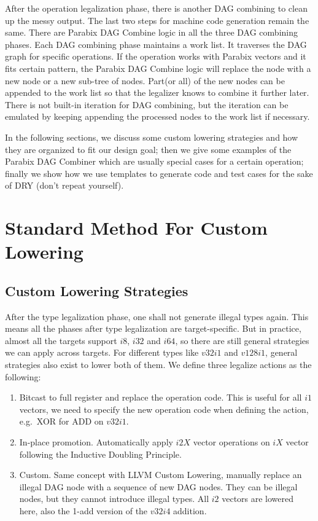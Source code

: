 After the operation legalization phase, there is another DAG combining to clean up the messy output. The last two steps for machine code generation remain the same. There are Parabix DAG Combine logic in all the three DAG combining phases. Each DAG combining phase maintains a work list. It traverses the DAG graph for specific operations. If the operation works with Parabix vectors and it fits certain pattern, the Parabix DAG Combine logic will replace the node with a new node or a new sub-tree of nodes. Part(or all) of the new nodes can be appended to the work list so that the legalizer knows to combine it further later. There is not built-in iteration for DAG combining, but the iteration can be emulated by keeping appending the processed nodes to the work list if necessary.

In the following sections, we discuss some custom lowering strategies and how they are organized to fit our design goal; then we give some examples of the Parabix DAG Combiner which are usually special cases for a certain operation; finally we show how we use templates to generate code and test cases for the sake of DRY (don't repeat yourself).

\section{Standard Method For Custom Lowering}
\subsection{Custom Lowering Strategies}
After the type legalization phase, one shall not generate illegal types again. This means all the phases after type legalization are target-specific. But in practice, almost all the targets support $i8$, $i32$ and $i64$, so there are still general strategies we can apply across targets. For different types like $v32i1$ and $v128i1$, general strategies also exist to lower both of them. We define three legalize actions as the following:
\begin{enumerate}
    \item Bitcast to full register and replace the operation code. This is useful for all $i1$ vectors, we need to specify the new operation code when defining the action, e.g.\ XOR for ADD on $v32i1$.
    \item In-place promotion. Automatically apply $i2X$ vector operations on $iX$ vector following the Inductive Doubling Principle.
    \item Custom. Same concept with LLVM Custom Lowering, manually replace an illegal DAG node with a sequence of new DAG nodes. They can be illegal nodes, but they cannot introduce illegal types. All $i2$ vectors are lowered here, also the 1-add version of the $v32i4$ addition.
\end{enumerate}

